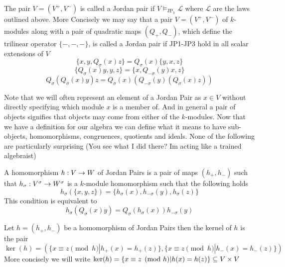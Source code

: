 \begin{definition}
    The pair $V=(V^+,V^-)$ is called a Jordan pair if $V\vDash_{\text{JP}_k}\mathcal{L}$ where $\mathcal{L}$ 
    are the laws outlined above. More Concisely we may say that a pair $V=(V^+,V^-)$ of $k$-modules
    along with a pair of quadratic maps $(Q_+,Q_-)$, which define the trilinear operator $\{-,-,-\}$, 
    is called a Jordan pair if JP1-JP3 hold in all scalar extensions of $V$
    \begin{equation}
        \tag{JP1}
        \{x,y,Q_\sigma(x)z\}=Q_\sigma(x)\{y,x,z\}
    \end{equation}
    \begin{equation}
        \tag{JP2}
        \{Q_\sigma(x)y,y,z\}=\{x,Q_{-\sigma}(y)x,z\}
    \end{equation}
    \begin{equation}
        \tag{JP3}
        Q_{\sigma}(Q_{\sigma}(x)y)z=Q_{\sigma}(x)(Q_{-\sigma}(y)(Q_{\sigma}(x)z))
    \end{equation}
\end{definition}
Note that we will often represent an element of a Jordan Pair as $x\in V$ without directly 
specifying which module $x$ is a member of. And in general a pair of objects signifies that 
objects may come from either of the $k$-modules.
Now that we have a definition for our algebra we can define what it means to have sub-objects, 
homomorphisms, congruences, quotients and ideals. None of the following are particularly surprising (You see what I did there? Im acting like a trained algebraist)
\begin{definition}
    A homomorphism $h:V\rightarrow W$ of Jordan Pairs is a pair of maps $(h_+,h_-)$ such that $h_\sigma:V^\sigma\rightarrow W^\sigma$ is a 
    $k$-module homomorphism such that the following holds
    \begin{equation}
        h_{\sigma}(\{x,y,z\})=\{h_{\sigma}(x),h_{-\sigma}(y),h_{\sigma}(z)\}
    \end{equation}
    This condition is equivalent to 
    \begin{equation}
        h_{\sigma}(Q_{\sigma}(x)y)=Q_{\sigma}(h_{\sigma}(x))h_{-\sigma}(y)
    \end{equation}
\end{definition}


\begin{definition}
    Let $h=(h_+,h_-)$ be a homomorphism of Jordan Pairs then the kernel of $h$ is the pair 
    $\ker(h)=(\{x\equiv z \pmod h | h_+(x)=h_+(z)\},\{x\equiv z \pmod h | h_-(x)=h_-(z)\})$
    More concisely we will write $\ker(h)=\{x\equiv z \pmod h | h(x)=h(z)\}\subseteq V\times V$
\end{definition}

